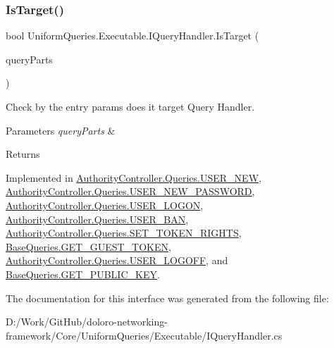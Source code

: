 \mbox{\label{interface_uniform_queries_1_1_executable_1_1_i_query_handler_a0f43184bf3e306a7cbebc39098f044ee}} 
\subsubsection{\texorpdfstring{Is\+Target()}{IsTarget()}}
{\footnotesize\ttfamily bool Uniform\+Queries.\+Executable.\+I\+Query\+Handler.\+Is\+Target (\begin{DoxyParamCaption}\item[{\mbox{\hyperlink{struct_uniform_queries_1_1_query_part}{Query\+Part}} \mbox{[}$\,$\mbox{]}}]{query\+Parts }\end{DoxyParamCaption})}



Check by the entry params does it target Query Handler. 


\begin{DoxyParams}{Parameters}
{\em query\+Parts} & \\
\hline
\end{DoxyParams}
\begin{DoxyReturn}{Returns}

\end{DoxyReturn}


Implemented in \mbox{\hyperlink{class_authority_controller_1_1_queries_1_1_u_s_e_r___n_e_w_a279a4acc2e4cad572f9760e62062d8e8}{Authority\+Controller.\+Queries.\+U\+S\+E\+R\+\_\+\+N\+EW}}, \mbox{\hyperlink{class_authority_controller_1_1_queries_1_1_u_s_e_r___n_e_w___p_a_s_s_w_o_r_d_aef792462301f1687630b64e5479f3f73}{Authority\+Controller.\+Queries.\+U\+S\+E\+R\+\_\+\+N\+E\+W\+\_\+\+P\+A\+S\+S\+W\+O\+RD}}, \mbox{\hyperlink{class_authority_controller_1_1_queries_1_1_u_s_e_r___l_o_g_o_n_a53261c6c60dc1a2324a67adf19f7547a}{Authority\+Controller.\+Queries.\+U\+S\+E\+R\+\_\+\+L\+O\+G\+ON}}, \mbox{\hyperlink{class_authority_controller_1_1_queries_1_1_u_s_e_r___b_a_n_a4f42625ac06de3292575a043ff0addd9}{Authority\+Controller.\+Queries.\+U\+S\+E\+R\+\_\+\+B\+AN}}, \mbox{\hyperlink{class_authority_controller_1_1_queries_1_1_s_e_t___t_o_k_e_n___r_i_g_h_t_s_a605feed66d357dc93ccc825068d83c96}{Authority\+Controller.\+Queries.\+S\+E\+T\+\_\+\+T\+O\+K\+E\+N\+\_\+\+R\+I\+G\+H\+TS}}, \mbox{\hyperlink{class_base_queries_1_1_g_e_t___g_u_e_s_t___t_o_k_e_n_adb9e113e010750eeedd261ce6811da1c}{Base\+Queries.\+G\+E\+T\+\_\+\+G\+U\+E\+S\+T\+\_\+\+T\+O\+K\+EN}}, \mbox{\hyperlink{class_authority_controller_1_1_queries_1_1_u_s_e_r___l_o_g_o_f_f_afbfa78117d68ab2bd2728c78d31c1c58}{Authority\+Controller.\+Queries.\+U\+S\+E\+R\+\_\+\+L\+O\+G\+O\+FF}}, and \mbox{\hyperlink{class_base_queries_1_1_g_e_t___p_u_b_l_i_c___k_e_y_a15316117d19cd8d85fb90a37bad5e9d7}{Base\+Queries.\+G\+E\+T\+\_\+\+P\+U\+B\+L\+I\+C\+\_\+\+K\+EY}}.



The documentation for this interface was generated from the following file\+:\begin{DoxyCompactItemize}
\item 
D\+:/\+Work/\+Git\+Hub/doloro-\/networking-\/framework/\+Core/\+Uniform\+Queries/\+Executable/I\+Query\+Handler.\+cs\end{DoxyCompactItemize}

